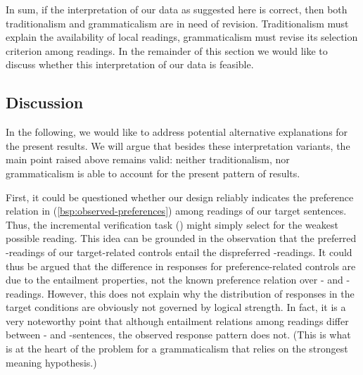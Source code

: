 \documentclass[fleqn,reqno,10pt,draft]{article}
\newcommand{\as}{\acro{as}}
\renewcommand{\es}{\acro{es}}
\newcommand{\lc}{\acro{lc}}
\newcommand{\ec}{\acro{ec}}
\newcommand{\ivt}{\acro{ivt}}
\begin{document}
In sum, if the interpretation of our data as suggested here is
correct, then both traditionalism and grammaticalism are in need of
revision. Traditionalism must explain the availability of local
readings, grammaticalism must revise its selection criterion among
readings. In the remainder of this section we would like to discuss
whether this interpretation of our data is feasible.

\subsection{Discussion}
\label{sec:discussion}


In the following, we would like to address potential alternative
explanations for the present results. We will argue that besides
these interpretation variants, the main point raised
above remains valid: neither traditionalism, nor grammaticalism
is able to account for the present pattern of results.


First, it could be questioned whether our design reliably 
indicates the preference relation in (\ref{bsp:observed-preferences}) 
among readings of our target sentences. Thus, the incremental verification task
(\ivt) might simply select for the weakest possible reading. This idea
can be grounded in the observation that the preferred \lc-readings
of our target-related controls entail the dispreferred
\ec-readings. It could thus be argued that the difference in responses
for preference-related controls are due to the entailment properties,
not the known preference relation over \lc- and \ec-readings. However, this
does not explain why the distribution of responses in the target
conditions are obviously not governed by logical strength. In fact, it
is a very noteworthy point that although entailment relations among
readings differ between \as- and \es-sentences, the observed response
pattern does not. (This is what is at the heart of the problem for a
grammaticalism that relies on the strongest meaning hypothesis.)
\end{document}
